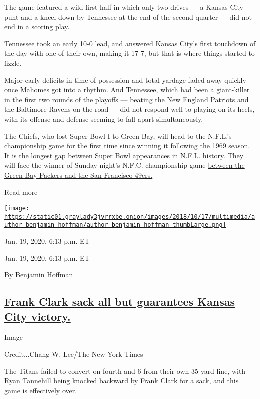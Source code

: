 The game featured a wild first half in which only two drives --- a
Kansas City punt and a kneel-down by Tennessee at the end of the second
quarter --- did not end in a scoring play.

Tennessee took an early 10-0 lead, and answered Kansas City's first
touchdown of the day with one of their own, making it 17-7, but that is
where things started to fizzle.

Major early deficits in time of possession and total yardage faded away
quickly once Mahomes got into a rhythm. And Tennessee, which had been a
giant-killer in the first two rounds of the playoffs --- beating the New
England Patriots and the Baltimore Ravens on the road --- did not
respond well to playing on its heels, with its offense and defense
seeming to fall apart simultaneously.

The Chiefs, who lost Super Bowl I to Green Bay, will head to the
N.F.L.'s championship game for the first time since winning it following
the 1969 season. It is the longest gap between Super Bowl appearances in
N.F.L. history. They will face the winner of Sunday night's N.F.C.
championship game
\href{https://www.nytimes3xbfgragh.onion/live/2020/packers-49ers/}{between
the Green Bay Packers and the San Francisco 49ers.}

Read more

\href{https://www.nytimes3xbfgragh.onion/by/benjamin-hoffman}{\texttt{[image: https://static01.graylady3jvrrxbe.onion/images/2018/10/17/multimedia/author-benjamin-hoffman/author-benjamin-hoffman-thumbLarge.png]}}

Jan. 19, 2020, 6:13 p.m. ET

Jan. 19, 2020, 6:13 p.m. ET

By
\href{https://www.nytimes3xbfgragh.onion/by/benjamin-hoffman}{Benjamin
Hoffman}

\hypertarget{frank-clark-sack-all-but-guarantees-kansas-city-victory}{%
\subsection{\texorpdfstring{\protect\hyperlink{frank-clark-sack-all-but-guarantees-kansas-city-victory}{Frank
Clark sack all but guarantees Kansas City
victory.}}{Frank Clark sack all but guarantees Kansas City victory.}}\label{frank-clark-sack-all-but-guarantees-kansas-city-victory}}

Image

Credit...Chang W. Lee/The New York Times

The Titans failed to convert on fourth-and-6 from their own 35-yard
line, with Ryan Tannehill being knocked backward by Frank Clark for a
sack, and this game is effectively over.

